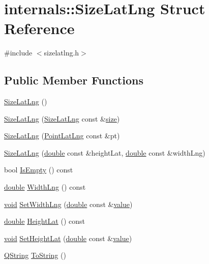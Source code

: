 \hypertarget{structinternals_1_1_size_lat_lng}{\section{internals\-:\-:Size\-Lat\-Lng Struct Reference}
\label{structinternals_1_1_size_lat_lng}
}


{\ttfamily \#include $<$sizelatlng.\-h$>$}

\subsection*{Public Member Functions}
\begin{DoxyCompactItemize}
\item 
\hyperlink{group___o_p_map_widget_ga577f5727b9da5a209c90b8a1616d168c}{Size\-Lat\-Lng} ()
\item 
\hyperlink{group___o_p_map_widget_ga3981b48b207701daa66030fc596bfda2}{Size\-Lat\-Lng} (\hyperlink{structinternals_1_1_size_lat_lng}{Size\-Lat\-Lng} const \&\hyperlink{glext_8h_a014d89bd76f74ef3a29c8f04b473eb76}{size})
\item 
\hyperlink{group___o_p_map_widget_gaac692b4a2979e688baced1205991cf2a}{Size\-Lat\-Lng} (\hyperlink{structinternals_1_1_point_lat_lng}{Point\-Lat\-Lng} const \&pt)
\item 
\hyperlink{group___o_p_map_widget_ga1d7d8f77f50a09f416f4fd64170db374}{Size\-Lat\-Lng} (\hyperlink{_super_l_u_support_8h_a8956b2b9f49bf918deed98379d159ca7}{double} const \&height\-Lat, \hyperlink{_super_l_u_support_8h_a8956b2b9f49bf918deed98379d159ca7}{double} const \&width\-Lng)
\item 
bool \hyperlink{group___o_p_map_widget_ga33e0b9f4dd15b12e9a3053753a9d2335}{Is\-Empty} () const 
\item 
\hyperlink{_super_l_u_support_8h_a8956b2b9f49bf918deed98379d159ca7}{double} \hyperlink{group___o_p_map_widget_ga4c692638cdb086a911d2bfc4a8d93f70}{Width\-Lng} () const 
\item 
\hyperlink{group___u_a_v_objects_plugin_ga444cf2ff3f0ecbe028adce838d373f5c}{void} \hyperlink{group___o_p_map_widget_ga73df3d96826b8dbf86b2676c759d867e}{Set\-Width\-Lng} (\hyperlink{_super_l_u_support_8h_a8956b2b9f49bf918deed98379d159ca7}{double} const \&\hyperlink{glext_8h_aa0e2e9cea7f208d28acda0480144beb0}{value})
\item 
\hyperlink{_super_l_u_support_8h_a8956b2b9f49bf918deed98379d159ca7}{double} \hyperlink{group___o_p_map_widget_ga54840364c05e0258bc30df133bd36107}{Height\-Lat} () const 
\item 
\hyperlink{group___u_a_v_objects_plugin_ga444cf2ff3f0ecbe028adce838d373f5c}{void} \hyperlink{group___o_p_map_widget_gaf25f9fe7c877df23a2cce0194354c001}{Set\-Height\-Lat} (\hyperlink{_super_l_u_support_8h_a8956b2b9f49bf918deed98379d159ca7}{double} const \&\hyperlink{glext_8h_aa0e2e9cea7f208d28acda0480144beb0}{value})
\item 
\hyperlink{group___u_a_v_objects_plugin_gab9d252f49c333c94a72f97ce3105a32d}{Q\-String} \hyperlink{group___o_p_map_widget_ga70356ecffc32e8609752c282f95c7183}{To\-String} ()
\end{DoxyCompactItemize}
